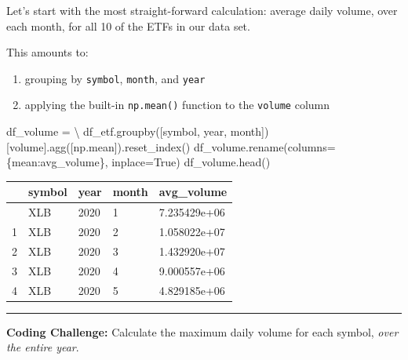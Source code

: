 \documentclass[
  letterpaper,
  DIV=11,
  numbers=noendperiod]{scrreprt}
\newenvironment{Shaded}{\begin{snugshade}}{\end{snugshade}}
\newcommand{\NormalTok}[1]{\textcolor[rgb]{0.00,0.23,0.31}{#1}}
\newcommand{\OperatorTok}[1]{\textcolor[rgb]{0.37,0.37,0.37}{#1}}
\newcommand{\StringTok}[1]{\textcolor[rgb]{0.13,0.47,0.30}{#1}}
\newcommand{\VariableTok}[1]{\textcolor[rgb]{0.07,0.07,0.07}{#1}}
\begin{document}
Let's start with the most straight-forward calculation: average daily
volume, over each month, for all 10 of the ETFs in our data set.

This amounts to:

\begin{enumerate}
\def\labelenumi{\arabic{enumi}.}
\item
  grouping by \texttt{symbol}, \texttt{month}, and \texttt{year}
\item
  applying the built-in \texttt{np.mean()} function to the
  \texttt{volume} column
\end{enumerate}

\begin{Shaded}
\begin{Highlighting}[]
\NormalTok{df\_volume }\OperatorTok{=} \OperatorTok{\textbackslash{}}
\NormalTok{    df\_etf.groupby([}\StringTok{\textquotesingle{}symbol\textquotesingle{}}\NormalTok{, }\StringTok{\textquotesingle{}year\textquotesingle{}}\NormalTok{, }\StringTok{\textquotesingle{}month\textquotesingle{}}\NormalTok{])[}\StringTok{\textquotesingle{}volume\textquotesingle{}}\NormalTok{].agg([np.mean]).reset\_index()}
\NormalTok{df\_volume.rename(columns}\OperatorTok{=}\NormalTok{\{}\StringTok{\textquotesingle{}mean\textquotesingle{}}\NormalTok{:}\StringTok{\textquotesingle{}avg\_volume\textquotesingle{}}\NormalTok{\}, inplace}\OperatorTok{=}\VariableTok{True}\NormalTok{)}
\NormalTok{df\_volume.head()}
\end{Highlighting}
\end{Shaded}

\begin{longtable}[]{@{}lllll@{}}
\toprule\noalign{}
& symbol & year & month & avg\_volume \\
\midrule\noalign{}
\endhead
\bottomrule\noalign{}
\endlastfoot
0 & XLB & 2020 & 1 & 7.235429e+06 \\
1 & XLB & 2020 & 2 & 1.058022e+07 \\
2 & XLB & 2020 & 3 & 1.432920e+07 \\
3 & XLB & 2020 & 4 & 9.000557e+06 \\
4 & XLB & 2020 & 5 & 4.829185e+06 \\
\end{longtable}

\begin{center}\rule{0.5\linewidth}{0.5pt}\end{center}

\textbf{Coding Challenge:} Calculate the maximum daily volume for each
symbol, \emph{over the entire year}.
\end{document}
